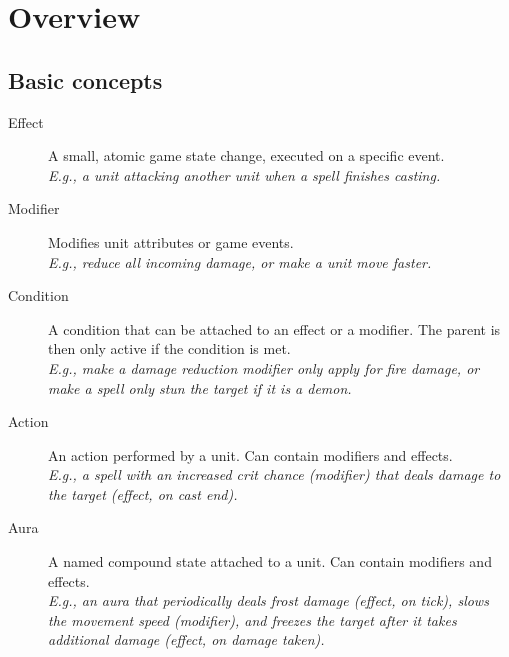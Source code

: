\chapter{Overview}

\section{Basic concepts}

\begin{description}
	\item [Effect] A small, atomic game state change, executed on a specific event.\\
		\textit{E.g., a unit attacking another unit when a spell finishes casting.}
	\item [Modifier] Modifies unit attributes or game events.\\
		\textit{E.g., reduce all incoming damage, or make a unit move faster.}
	\item [Condition] A condition that can be attached to an effect or a modifier. The parent is then only active if the condition is met.\\
		\textit{E.g., make a damage reduction modifier only apply for fire damage, or make a spell only stun the target if it is a demon.}
	\item [Action] An action performed by a unit. Can contain modifiers and effects.\\
		\textit{E.g., a spell with an increased crit chance (modifier) that deals damage to the target (effect, on cast end).}
	\item [Aura] A named compound state attached to a unit. Can contain modifiers and effects.\\
		\textit{E.g., an aura that periodically deals frost damage (effect, on tick), slows the movement speed (modifier), and freezes the target after it takes additional damage (effect, on damage taken).}
\end{description}


